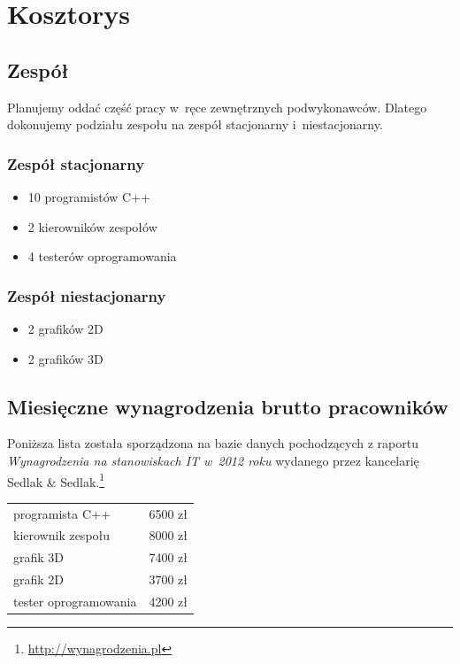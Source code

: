\documentclass{mwrep}
\begin{document}
\chapter{Kosztorys}

\section{Zespół}

Planujemy oddać część pracy w~ręce zewnętrznych podwykonawców. Dlatego dokonujemy podziału zespołu na zespół stacjonarny i~niestacjonarny.

\subsection{Zespół stacjonarny}

\begin{itemize}
\item 10 programistów C++
\item 2 kierowników zespołów
\item 4 testerów oprogramowania
\end{itemize}

\subsection{Zespół niestacjonarny}

\begin{itemize}
\item 2 grafików 2D
\item 2 grafików 3D
\end{itemize}

\section{Miesięczne wynagrodzenia brutto pracowników}

Poniższa lista została sporządzona na bazie danych pochodzących z raportu \emph{Wynagrodzenia na stanowiskach IT w~2012 roku} wydanego przez kancelarię Sedlak \& Sedlak.\footnote{\url{http://wynagrodzenia.pl}} \\

\begin{tabular}{lr}
programista C++ & 6500 zł \\
kierownik zespołu & 8000 zł \\
grafik 3D & 7400 zł \\
grafik 2D & 3700 zł \\
tester oprogramowania & 4200 zł
\end{tabular}
\end{document}
